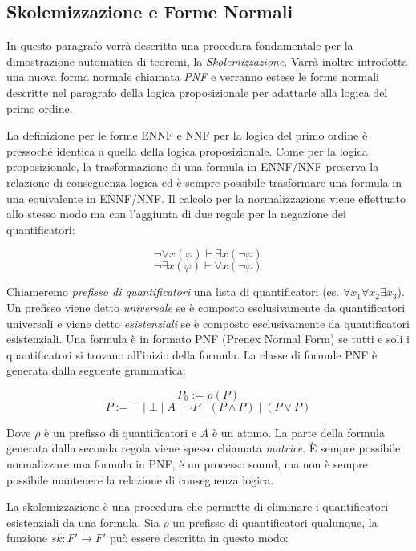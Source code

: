 \documentclass[./main.tex]{subfiles}
\begin{document}

\subsection{Skolemizzazione e Forme Normali} \label{sec:forme_normali_fof}
In questo paragrafo verrà descritta una procedura fondamentale per la dimostrazione automatica di teoremi, la \textit{Skolemizzazione}. Varrà inoltre introdotta
una nuova forma normale chiamata \textit{PNF} e verranno
estese le forme normali descritte nel paragrafo della logica proposizionale per adattarle alla logica del primo ordine.


La definizione per le forme ENNF e NNF per la logica del primo ordine è pressoché identica a quella della logica proposizionale.
Come per la logica proposizionale, la trasformazione di una formula in ENNF/NNF preserva la relazione di conseguenza logica ed è sempre
possibile trasformare una formula in una equivalente in ENNF/NNF. 
Il calcolo per la normalizzazione viene effettuato allo stesso modo ma con l'aggiunta di due regole per la negazione dei quantificatori:

$$ \lnot \forall x (\varphi) \vdash \exists x (\lnot \varphi) $$
$$ \lnot \exists x (\varphi) \vdash \forall x (\lnot \varphi) $$


Chiameremo \textit{prefisso di quantificatori} una lista di quantificatori (es. $\forall x_1 \forall x_2 \exists x_3$). 
Un prefisso viene detto \textit{universale} se è composto esclusivamente da quantificatori universali e viene detto \textit{esistenziali} 
se è composto esclusivamente da quantificatori esistenziali. Una formula è in formato PNF (Prenex Normal Form) se tutti e soli 
i quantificatori si trovano all'inizio della formula. La classe di formule PNF è generata dalla seguente grammatica:

$$ P_0 := \rho(P) $$
$$ P := \top \mid \bot \mid A \mid \lnot P \mid (P \land P) \mid (P \lor P) $$

Dove $\rho$ è un prefisso di quantificatori e $A$ è un atomo.
La parte della formula generata dalla seconda regola viene spesso chiamata \textit{matrice}.
È sempre possibile normalizzare una formula in PNF, è un processo sound, ma non è sempre possibile mantenere la relazione di conseguenza logica.


La skolemizzazione è una procedura che permette di eliminare i quantificatori esistenziali da una formula. 
Sia $\rho$ un prefisso di quantificatori qualunque, la funzione $sk : F' \rightarrow F'$ può essere descritta in questo modo:
\end{document}
